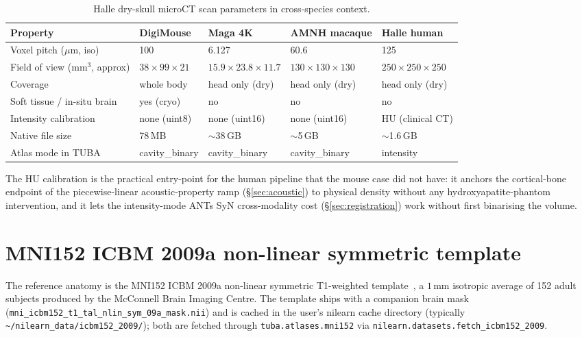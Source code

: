 \documentclass{compactarticle}
\begin{document}
\begin{table}[H]
\centering
\caption{Halle dry-skull microCT scan parameters in cross-species
context.}\label{tab:source}
\begin{tabular}{lllll}
\toprule
Property & DigiMouse & Maga 4K & AMNH macaque & Halle human \\
\midrule
Voxel pitch ($\mu$m, iso) & 100 & 6.127 & 60.6 & 125 \\
Field of view (mm$^3$, approx) & $38\times99\times21$ & $15.9\times23.8\times11.7$ & $130\times130\times130$ & $250\times250\times250$ \\
Coverage & whole body & head only (dry) & head only (dry) & head only (dry) \\
Soft tissue / in-situ brain & yes (cryo) & no & no & no \\
Intensity calibration & none (uint8) & none (uint16) & none (uint16) & HU (clinical CT) \\
Native file size & 78\,MB & $\sim$38\,GB & $\sim$5\,GB & $\sim$1.6\,GB \\
Atlas mode in TUBA & cavity\_binary & cavity\_binary & cavity\_binary & intensity \\
\bottomrule
\end{tabular}
\end{table}

The HU calibration is the practical entry-point for the human pipeline that
the mouse case did not have: it anchors the cortical-bone endpoint of the
piecewise-linear acoustic-property ramp (\S\ref{sec:acoustic}) to physical
density without any hydroxyapatite-phantom intervention, and it lets the
intensity-mode ANTs SyN cross-modality cost (\S\ref{sec:registration}) work
without first binarising the volume.

\section{MNI152 ICBM 2009a non-linear symmetric template}\label{sec:atlas}
The reference anatomy is the MNI152 ICBM 2009a non-linear symmetric
T1-weighted template~\cite{fonov2009}, a $1$\,mm isotropic average of 152
adult subjects produced by the McConnell Brain Imaging Centre. The
template ships with a companion brain mask
(\texttt{mni\_icbm152\_t1\_tal\_nlin\_sym\_09a\_mask.nii}) and is cached
in the user's nilearn cache directory (typically
\texttt{\textasciitilde/nilearn\_data/icbm152\_2009/}); both are fetched
through \texttt{tuba.atlases.mni152} via
\texttt{nilearn.datasets.fetch\_icbm152\_2009}.
\end{document}
